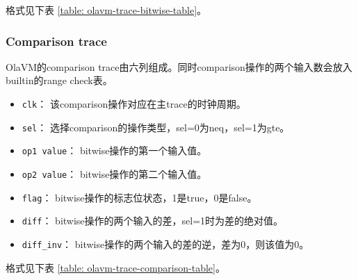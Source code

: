 格式见下表 \ref{table: olavm-trace-bitwise-table}。

\begin{table}[!ht]
    \centering {}
    \caption{OlaVM的bitwise的trace表结构}
    \label{table: olavm-trace-bitwise-table}
\end{table}

\subsubsection{Comparison trace}\label{subsubsec: olavm-comparison-trace}
OlaVM的comparison trace由六列组成。同时comparison操作的两个输入数会放入builtin的range check表。
\begin{itemize}
    \item \verb|clk|： 该comparison操作对应在主trace的时钟周期。
    \item \verb|sel|： 选择comparison的操作类型，sel=0为neq，sel=1为gte。
    \item \verb|op1 value|： bitwise操作的第一个输入值。
    \item \verb|op2 value|： bitwise操作的第二个输入值。
    \item \verb|flag|： bitwise操作的标志位状态，1是true，0是false。
    \item \verb|diff|： bitwise操作的两个输入的差，sel=1时为差的绝对值。
    \item \verb|diff_inv|： bitwise操作的两个输入的差的逆，差为0，则该值为0。
\end{itemize}

格式见下表 \ref{table: olavm-trace-comparison-table}。

\begin{table}[!ht]
    \centering {}
    \caption{OlaVM的comparison的trace表结构}
    \label{table: olavm-trace-comparison-table}
\end{table}